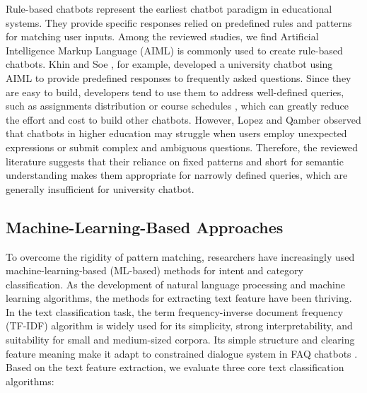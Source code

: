 \documentclass[12pt,a4paper]{article}
\begin{document}
Rule-based chatbots represent the earliest chatbot paradigm in educational systems. They provide specific responses relied on predefined rules and patterns for matching user inputs. Among the reviewed studies, we find Artificial Intelligence Markup Language (AIML) is commonly used to create rule-based chatbots. Khin and Soe \cite{khin2020}, for example, developed a university chatbot using AIML to provide predefined responses to frequently asked questions. Since they are easy to build, developers tend to use them to address well-defined queries, such as assignments distribution or course schedules \cite{nguyen2021,alghadhban2020,dinesh2021}, which can greatly reduce the effort and cost to build other chatbots. However, Lopez and Qamber \cite{lopez2022} observed that chatbots in higher education may struggle when users employ unexpected expressions or submit complex and ambiguous questions. Therefore, the reviewed literature suggests that their reliance on fixed patterns and short for semantic understanding makes them appropriate for narrowly defined queries, which are generally insufficient for university chatbot.

\subsection{Machine-Learning-Based Approaches}

To overcome the rigidity of pattern matching, researchers have increasingly used machine-learning-based (ML-based) methods for intent and category classification. As the development of natural language processing and machine learning algorithms, the methods for extracting text feature have been thriving. In the text classification task, the term frequency-inverse document frequency (TF-IDF) algorithm is widely used for its simplicity, strong interpretability, and suitability for small and medium-sized corpora. Its simple structure and clearing feature meaning make it adapt to constrained dialogue system in FAQ chatbots \cite{ashraf2024,yang2026}. Based on the text feature extraction, we evaluate three core text classification algorithms:
\end{document}
